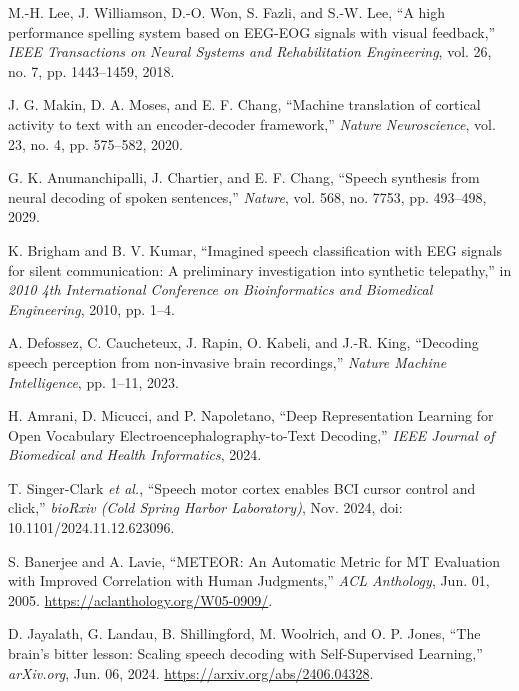 \documentclass[journal]{IEEEtran}
\begin{document}
\begin{thebibliography}{1}
	M.-H. Lee, J. Williamson, D.-O. Won, S. Fazli, and S.-W. Lee, ``A high performance spelling system based on EEG-EOG signals with visual feedback,'' \textit{IEEE Transactions on Neural Systems and Rehabilitation Engineering}, vol. 26, no. 7, pp. 1443–1459, 2018.
	
	J. G. Makin, D. A. Moses, and E. F. Chang, ``Machine translation of cortical activity to text with an encoder-decoder framework,'' \textit{Nature Neuroscience}, vol. 23, no. 4, pp. 575–582, 2020.
	
	G. K. Anumanchipalli, J. Chartier, and E. F. Chang, ``Speech synthesis from neural decoding of spoken sentences,'' \textit{Nature}, vol. 568, no. 7753, pp. 493–498, 2029.
	
	K. Brigham and B. V. Kumar, ``Imagined speech classification with EEG signals for silent communication: A preliminary investigation into synthetic telepathy,'' in \textit{2010 4th International Conference on Bioinformatics and Biomedical Engineering}, 2010, pp. 1–4.
	
	A. Defossez, C. Caucheteux, J. Rapin, O. Kabeli, and J.-R. King, ``Decoding speech perception from non-invasive brain recordings,'' \textit{Nature Machine Intelligence}, pp. 1–11, 2023.
	
	H. Amrani, D. Micucci, and P. Napoletano, ``Deep Representation Learning for Open Vocabulary Electroencephalography-to-Text Decoding,'' \emph{IEEE Journal of Biomedical and Health Informatics}, 2024.
	
	T. Singer-Clark \textit{et al.}, “Speech motor cortex enables BCI cursor control and click,” 
	\textit{bioRxiv (Cold Spring Harbor Laboratory)}, Nov. 2024, doi: 10.1101/2024.11.12.623096.
	
	S. Banerjee and A. Lavie, “METEOR: An Automatic Metric for MT Evaluation with Improved Correlation with Human Judgments,” 
	\textit{ACL Anthology}, Jun. 01, 2005. \url{https://aclanthology.org/W05-0909/}.
	
	D. Jayalath, G. Landau, B. Shillingford, M. Woolrich, and O. P. Jones, “The brain’s bitter lesson: 
	Scaling speech decoding with Self-Supervised Learning,” \textit{arXiv.org}, Jun. 06, 2024. 
	\url{https://arxiv.org/abs/2406.04328}.
	
\end{thebibliography}
\appendices
\end{document}
